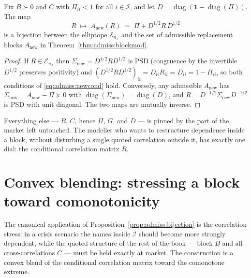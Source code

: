 \begin{proposition}
\label{prop:admiss:bijection}
Fix $B \succ 0$ and $C$ with $\Pi_{ii} < 1$ for all $i \in \mathcal I$, and
let $D = \operatorname{diag}(\mathbf{1} - \operatorname{diag}(\Pi))$. The
map
\[
  R \;\longmapsto\;
  A_{\mathrm{new}}(R) \;=\; \Pi + D^{1/2} R\, D^{1/2}
\]
is a bijection between the elliptope $\mathcal{E}_{n_{\mathcal I}}$ and the
set of admissible replacement blocks $A_{\mathrm{new}}$ in
Theorem~\ref{thm:admiss:blockmod}.
\end{proposition}

\begin{proof}
If $R \in \mathcal{E}_{n_{\mathcal I}}$ then $\Sigma_{\mathrm{new}} =
D^{1/2} R D^{1/2}$ is PSD (congruence by the invertible $D^{1/2}$ preserves
positivity) and $(D^{1/2} R D^{1/2})_{ii} = D_{ii} R_{ii} = D_{ii} =
1 - \Pi_{ii}$, so both conditions of \eqref{eq:admiss:newcond} hold.
Conversely, any admissible $A_{\mathrm{new}}$ has $\Sigma_{\mathrm{new}} =
A_{\mathrm{new}} - \Pi \succeq 0$ with
$\operatorname{diag}(\Sigma_{\mathrm{new}}) = \operatorname{diag}(D)$, and
$R = D^{-1/2} \Sigma_{\mathrm{new}} D^{-1/2}$ is PSD with unit diagonal.
The two maps are mutually inverse.
\end{proof}

Everything else --- $B$, $C$, hence $\Pi$, $G$, and $D$ --- is pinned by the
part of the market left untouched. The modeller who wants to
restructure dependence inside a block, without disturbing a single quoted
correlation outside it, has exactly one dial: the conditional correlation
matrix $R$.

\section{Convex blending: stressing a block toward comonotonicity}
\label{sec:admiss:blend}

The canonical application of Proposition~\ref{prop:admiss:bijection} is the
correlation stress: in a crisis scenario the names inside $\mathcal I$
should become more strongly dependent, while the quoted structure of the
rest of the book --- block $B$ and all cross-correlations $C$ --- must be
held exactly at market. The construction is a convex blend of the
conditional correlation matrix toward the comonotone extreme.

